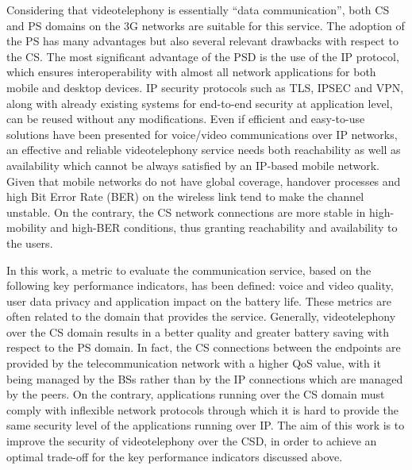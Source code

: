 \documentclass[10pt, conference, compsocconf]{IEEEtran}
\begin{document}
Considering that videotelephony is essentially ``data communication'', both CS and PS domains on the 3G networks are suitable for this service. The adoption of the PS has many advantages but also several relevant drawbacks with respect to the CS. The most significant advantage of the PSD is the use of the IP protocol, which ensures interoperability with almost all network applications for both mobile and desktop devices. IP security protocols such as TLS, IPSEC and VPN, along with already existing systems for end-to-end security at application level, can be reused  without any modifications.
Even if efficient and easy-to-use solutions have been presented for voice/video communications over IP networks, an effective and reliable videotelephony service needs both reachability as well as availability which cannot be always satisfied by an IP-based mobile network. Given that mobile networks do not have global coverage, handover processes and high Bit Error Rate (BER) on the wireless link tend to make the channel unstable. On the contrary, the CS network connections are more stable in high-mobility and high-BER conditions, thus granting reachability and availability %
to the users.

In this work, a metric to evaluate the communication service, based on the following key performance indicators, has been defined: voice and video quality, user data privacy and application impact on the battery life. These metrics are often related to the domain that provides the service. Generally, videotelephony over the CS domain results in a better quality and greater battery saving with respect to the PS domain. In fact, the CS connections between the endpoints are provided by the telecommunication network with a higher QoS value, with it being managed by the BSs rather than by the IP connections which are managed by the peers. On the contrary, applications running over the CS domain must comply with inflexible network protocols through which it is hard to provide the same security level of the applications running over IP.
The aim of this work is to improve the security of videotelephony over the CSD, in order to achieve an optimal trade-off for the key performance indicators discussed above.

\end{document}
